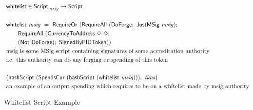 \begin{figure*}[htb]
  \begin{align*}
    & \mathsf{whitelist} \in\mathsf{Script}_{msig}\to\mathsf{Script}  \\~\\
    & \mathsf{whitelist}  ~\mathit{msig}~ =~ \mathsf{RequireOr}~
      (\mathsf{RequireAll}~(\mathsf{DoForge};~\mathsf{JustMSig}~\mathit{msig});~\\
    &~~~~~~ \mathsf{RequireAll}~(\mathsf{CurrencyToAddress}~\Diamond~\Diamond ;\\
    &~~~~~~ (\mathsf{Not}~\mathsf{DoForge});~\mathsf{SignedByPIDToken})) \\
    & \text{msig is some MSig script containing signatures of some accreditation authority} \\
    & \text{i.e. this authority can do any forging or spending of this token} \\~\\
    & (\mathsf{hashScript}~(\mathsf{SpendsCur}~(\mathsf{hashScript}~(\mathsf{whitelist}~\mathit{msig}))),~ \mathit{tkns}) \\
    & \text{an example of an output spending which requires to be on a whitelist made by msig authority}
  \end{align*}
  \caption{Whitelist Script Example}
  \label{fig:whitelist-example}
\end{figure*}
